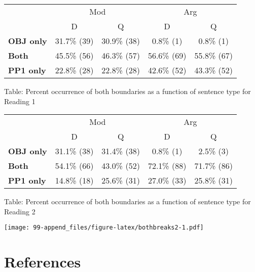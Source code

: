 \documentclass[11pt,oneside]{book}
\begin{document}
\begin{table}[!h]
\centering
\begin{tabular}{>{\bfseries}lcccc}
\toprule
\multicolumn{1}{c}{ } & \multicolumn{2}{c}{Mod} & \multicolumn{2}{c}{Arg} \\
\cmidrule(l{3pt}r{3pt}){2-3} \cmidrule(l{3pt}r{3pt}){4-5}
  & D & Q & D & Q\\
\midrule
OBJ only & 31.7\% (39) & 30.9\% (38) & 0.8\% (1) & 0.8\% (1)\\
Both & 45.5\% (56) & 46.3\% (57) & 56.6\% (69) & 55.8\% (67)\\
PP1 only & 22.8\% (28) & 22.8\% (28) & 42.6\% (52) & 43.3\% (52)\\
\bottomrule
\end{tabular}
\end{table}

Table: Percent occurrence of both boundaries as a function of sentence type for Reading 1

\begin{table}[!h]
\centering
\begin{tabular}{>{\bfseries}lcccc}
\toprule
\multicolumn{1}{c}{ } & \multicolumn{2}{c}{Mod} & \multicolumn{2}{c}{Arg} \\
\cmidrule(l{3pt}r{3pt}){2-3} \cmidrule(l{3pt}r{3pt}){4-5}
  & D & Q & D & Q\\
\midrule
OBJ only & 31.1\% (38) & 31.4\% (38) & 0.8\% (1) & 2.5\% (3)\\
Both & 54.1\% (66) & 43.0\% (52) & 72.1\% (88) & 71.7\% (86)\\
PP1 only & 14.8\% (18) & 25.6\% (31) & 27.0\% (33) & 25.8\% (31)\\
\bottomrule
\end{tabular}
\end{table}

Table: Percent occurrence of both boundaries as a function of sentence type for Reading 2

\texttt{[image: 99-append\_files/figure-latex/bothbreaks2-1.pdf]}

\hypertarget{references}{%
\chapter*{References}\label{references}}

\noindent
\vspace{-2em}
\setlength{\parindent}{-0.5in}
\setlength{\leftskip}{0.5in}
\setlength{\parskip}{15pt}
\end{document}
